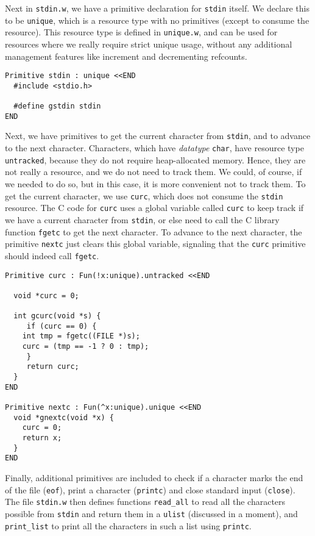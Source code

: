 \documentclass{book}[12pt]
\begin{document}
Next in \texttt{stdin.w}, we have a primitive declaration for
\texttt{stdin} itself.  We declare this to be \texttt{unique}, which
is a resource type with no primitives (except to consume the
resource).  This resource type is defined in \texttt{unique.w}, and
can be used for resources where we really require strict unique usage,
without any additional management features like increment and
decrementing refcounts.

\begin{verbatim}
Primitive stdin : unique <<END
  #include <stdio.h>

  #define gstdin stdin
END
\end{verbatim}

\noindent Next, we have primitives to get the current character from
\texttt{stdin}, and to advance to the next character.  Characters,
which have \emph{datatype} \texttt{char}, have resource type
\texttt{untracked}, because they do not require heap-allocated memory.
Hence, they are not really a resource, and we do not need to track
them.  We could, of course, if we needed to do so, but in this case,
it is more convenient not to track them.  To get the current
character, we use \texttt{curc}, which does not consume the
\texttt{stdin} resource.  The C code for \texttt{curc} uses a global
variable called \texttt{curc} to keep track if we have a current
character from \texttt{stdin}, or else need to call the C library
function \texttt{fgetc} to get the next character.  To advance to the
next character, the primitive \texttt{nextc} just clears this global
variable, signaling that the \texttt{curc} primitive should indeed
call \texttt{fgetc}.

\begin{verbatim}
Primitive curc : Fun(!x:unique).untracked <<END

  void *curc = 0;

  int gcurc(void *s) {
     if (curc == 0) {
	int tmp = fgetc((FILE *)s);
	curc = (tmp == -1 ? 0 : tmp);
     }
     return curc;
  }
END

Primitive nextc : Fun(^x:unique).unique <<END
  void *gnextc(void *x) {
    curc = 0;
    return x;
  }
END
\end{verbatim}

\noindent Finally, additional primitives are included to check if a
character marks the end of the file (\texttt{eof}), print a character
(\texttt{printc}) and close standard input (\texttt{close}).  The file
\texttt{stdin.w} then defines functions \texttt{read\_all} to read all
the characters possible from \texttt{stdin} and return them in a
\texttt{ulist} (discussed in a moment), and \texttt{print\_list} to print
all the characters in such a list using \texttt{printc}.
\end{document}
